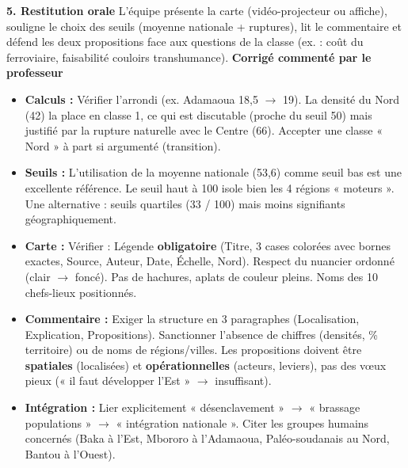 \documentclass[11pt]{article}
\begin{document}
\begin{exoresolu}
\textbf{5. Restitution orale}
L'équipe présente la carte (vidéo-projecteur ou affiche), souligne le choix des seuils (moyenne nationale + ruptures), lit le commentaire et défend les deux propositions face aux questions de la classe (ex. : coût du ferroviaire, faisabilité couloirs transhumance).
\tcblower
\textbf{Corrigé commenté par le professeur}
\begin{itemize}
    \item \textbf{Calculs :} Vérifier l'arrondi (ex. Adamaoua 18,5 $\to$ 19). La densité du Nord (42) la place en classe 1, ce qui est discutable (proche du seuil 50) mais justifié par la rupture naturelle avec le Centre (66). Accepter une classe « Nord » à part si argumenté (transition).
    \item \textbf{Seuils :} L'utilisation de la moyenne nationale (53,6) comme seuil bas est une excellente référence. Le seuil haut à 100 isole bien les 4 régions « moteurs ». Une alternative : seuils quartiles (33 / 100) mais moins signifiants géographiquement.
    \item \textbf{Carte :} Vérifier : Légende \textbf{obligatoire} (Titre, 3 cases colorées avec bornes exactes, Source, Auteur, Date, Échelle, Nord). Respect du nuancier ordonné (clair $\to$ foncé). Pas de hachures, aplats de couleur pleins. Noms des 10 chefs-lieux positionnés.
    \item \textbf{Commentaire :} Exiger la structure en 3 paragraphes (Localisation, Explication, Propositions). Sanctionner l'absence de chiffres (densités, \% territoire) ou de noms de régions/villes. Les propositions doivent être \textbf{spatiales} (localisées) et \textbf{opérationnelles} (acteurs, leviers), pas des vœux pieux (« il faut développer l'Est » $\to$ insuffisant).
    \item \textbf{Intégration :} Lier explicitement « désenclavement » $\to$ « brassage populations » $\to$ « intégration nationale ». Citer les groupes humains concernés (Baka à l'Est, Mbororo à l'Adamaoua, Paléo-soudanais au Nord, Bantou à l'Ouest).
\end{itemize}
\end{exoresolu}
\end{document}

